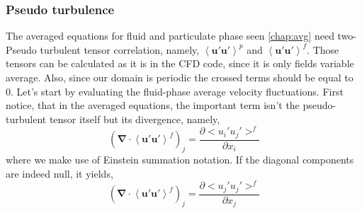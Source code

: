 \subsubsection{Pseudo turbulence}
The averaged equations for fluid and particulate phase seen \ref{chap:avg} need two-Pseudo turbulent tensor correlation,
namely, $\left<\bm{u'u'}\right>^p$ and $\left<\bm{u'u'}\right>^f$. 
Those tensors can be calculated as it is in the CFD code, since it is only fields variable average. 
Also, since our domain is periodic the crossed terms should be equal to 0.
Let's start by evaluating the fluid-phase average velocity fluctuations.
First notice, that in the averaged equations, the important term isn't the pseudo-turbulent tensor itself but its divergence, namely,
\begin{equation*}    
    \left(\bm{\nabla} \cdot \left<\bm{u}'\bm{u}'\right>^f \right)_j = \frac{\partial <u_i' u_j'>^f}{\partial x_i}
\end{equation*}
where we make use of Einstein summation notation.
If the diagonal components are indeed null, it yields,
\begin{equation*}    
    \left(\bm{\nabla} \cdot \left<\bm{u}'\bm{u}'\right>^f \right)_j 
    = \frac{\partial <u_j' u_j'>^f}{\partial x_j}
\end{equation*}
